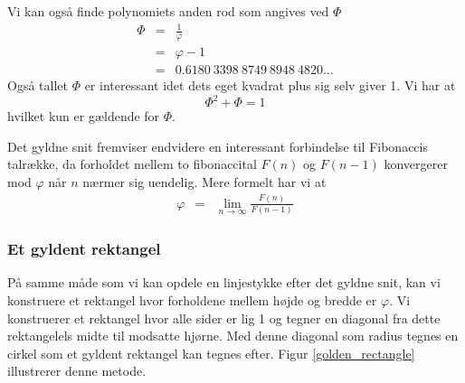 {Vi kan også finde polynomiets anden rod som angives ved $\varPhi$
\begin{eqnarray*}
	\varPhi & = & \frac{1}{\varphi} \\
		& = & \varphi - 1 \\
		& = & 0.6180\ 3398\ 8749\ 8948\ 4820 \dots 
\end{eqnarray*}
Også tallet $\varPhi$ er interessant idet dets eget kvadrat plus sig
selv giver 1. Vi har at
\begin{equation}
	\varPhi^{2} + \varPhi = 1
	\label{Phi_squared}
\end{equation}
hvilket kun er gældende for $\varPhi$.

Det gyldne snit fremviser endvidere en interessant forbindelse til
Fibonaccis talrække, da forholdet mellem to fibonaccital $F(n)$ og $F(n
- 1)$ konvergerer mod $\varphi$ når $n$ nærmer sig uendelig. Mere
formelt har vi at
\begin{eqnarray*}
	\varphi & =     & \lim_{n \rightarrow
	\infty}{\frac{F(n)}{F(n - 1)}}
\end{eqnarray*}

\subsubsection{Et gyldent rektangel}
På samme måde som vi kan opdele en linjestykke efter det gyldne snit,
kan vi konstruere et rektangel hvor forholdene mellem højde og bredde er
$\varphi$. Vi konstruerer et rektangel hvor alle sider er lig 1 og
tegner en diagonal fra dette rektangelels midte til modsatte hjørne. Med
denne diagonal som radius tegnes en cirkel som et gyldent rektangel kan
tegnes efter. Figur \ref{golden_rectangle} illustrerer denne metode.

}
